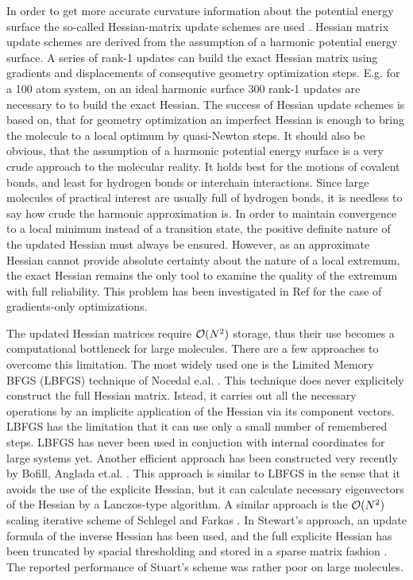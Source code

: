 \documentclass[prl,aps,twocolumn,showpacs,twocolumngrid,superbib]{revtex4}
\begin{document}
In order to get more accurate curvature information about the 
potential energy surface the so-called Hessian-matrix update schemes
are used \cite{RFletcher}. 
Hessian matrix update schemes are derived from the assumption of a 
harmonic potential energy surface. A series of rank-1 updates
can build the exact Hessian matrix using gradients and displacements
of consequtive geometry optimization steps.
E.g. for a 100 atom system, on an ideal harmonic surface 300 rank-1
updates are necessary to to build the exact Hessian. The success
of Hessian update schemes is based on, that for geometry optimization
an imperfect Hessian is enough to bring the molecule to a local 
optimum by quasi-Newton steps. 
It should also be obvious, that the assumption of a harmonic potential energy 
surface is a very crude approach to the molecular reality. 
It holds best for the motions of covalent bonds, and least for
hydrogen bonds or interchain interactions. Since large molecules of practical
interest are usually full of hydrogen bonds, it is needless to say how
crude the harmonic approximation is.
In order to maintain convergence to a local
minimum instead of a transition state, the positive definite nature
of the updated Hessian must always be ensured. However, as 
an approximate Hessian cannot provide absolute certainty about the 
nature of a local extremum, the exact Hessian remains the only tool
to examine the quality of the extremum with full reliability. 
This problem has been investigated
in Ref \cite{Wales_saddlepoint} for the case of 
gradients-only optimizations.

The updated Hessian matrices require ${\cal{O}}(N^{2})$ storage, thus
their use becomes a computational bottleneck for large molecules.
There are a few approaches to overcome this limitation.
The most widely used one is the Limited Memory BFGS (LBFGS) 
technique of Nocedal
e.al. \cite{nocedal_lbgs}. This technique does never explicitely 
construct the full Hessian matrix. Istead, it carries out all 
the necessary operations by an implicite application of the Hessian
via its component vectors. LBFGS
has the limitation that it can use only a small number of remembered
steps.
LBFGS has never been used in conjuction with internal coordinates
for large systems yet.
Another efficient approach has been constructed very recently by Bofill,
Anglada et.al. \cite{bofill_lanczos}. This approach is similar
to LBFGS in the sense that it avoids the use of the explicite
Hessian, but it can calculate necessary eigenvectors of the 
Hessian by a Lanczos-type algorithm. A
similar approach is the ${\cal{O}}(N^{2})$ scaling iterative
scheme of Schlegel and Farkas \cite{schlegel_on2iter}.
In Stewart's approach, an update
formula of the inverse Hessian has been used, and the full explicite
Hessian has been truncated by spacial thresholding and stored in a 
sparse matrix fashion \cite{Stewart_crambin_opt}. 
The reported performance
of Stuart's scheme was rather poor on large molecules.
\end{document}
